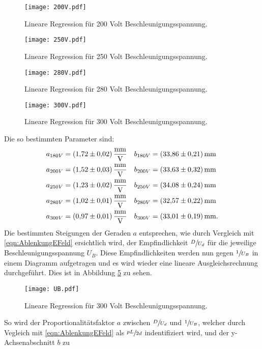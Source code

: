 \begin{figure}
  \centering
  \texttt{[image: 200V.pdf]}
  \caption{Lineare Regression für 200 Volt Beschleunigungsspannung.}
  \label{fig:200V}
\end{figure}
\begin{figure}
  \centering
  \texttt{[image: 250V.pdf]}
  \caption{Lineare Regression für 250 Volt Beschleunigungsspannung.}
  \label{fig:250V}
\end{figure}
\begin{figure}
  \centering
  \texttt{[image: 280V.pdf]}
  \caption{Lineare Regression für 280 Volt Beschleunigungsspannung.}
  \label{fig:280V}
\end{figure}
\begin{figure}
  \centering
  \texttt{[image: 300V.pdf]}
  \caption{Lineare Regression für 300 Volt Beschleunigungsspannung.}
  \label{fig:300V}
\end{figure}
\FloatBarrier
Die so bestimmten Parameter sind:
\begin{align*}
  a_{180V} &= \SI{1.72\pm0.02}{\milli\metre\per\volt} & b_{180V} &= \SI{33.86\pm0.21}{\milli\metre} \\
  a_{200V} &= \SI{1.52\pm0.03}{\milli\metre\per\volt} & b_{200V} &= \SI{33.63\pm0.32}{\milli\metre} \\
  a_{250V} &= \SI{1.23\pm0.02}{\milli\metre\per\volt} & b_{250V} &= \SI{34.08\pm0.24}{\milli\metre} \\
  a_{280V} &= \SI{1.02\pm0.01}{\milli\metre\per\volt} & b_{280V} &= \SI{32.57\pm0.22}{\milli\metre} \\
  a_{300V} &= \SI{0.97\pm0.01}{\milli\metre\per\volt} & b_{300V} &= \SI{33.01\pm0.19}{\milli\metre}.
\end{align*}
Die bestimmten Steigungen der Geraden $a$ entsprechen, wie durch Vergleich mit \eqref{eqn:AblenkungEFeld} ersichtlich wird, der Empfindlichkeit $\sfrac{D}{U_d}$ für
die jeweilige Beschleunigungsspannung $U_B$. Diese Empfindlichkeiten werden nun gegen $\sfrac{1}{U_B}$ in einem Diagramm aufgetragen und es wird wieder eine lineare
Ausgleichsrechnung durchgeführt. Dies ist in Abbildung \ref{fig:UB} zu sehen.
\begin{figure}
  \centering
  \texttt{[image: UB.pdf]}
  \caption{Lineare Regression für 300 Volt Beschleunigungsspannung.}
  \label{fig:UB}
\end{figure}
So wird der Proportionalitätsfaktor $a$ zwischen $\sfrac{D}{U_d}$ und $\sfrac{1}{U_B}$, welcher durch Vegleich mit \eqref{eqn:AblenkungEFeld} als
$\sfrac{pL}{2d}$ indentifiziert wird, und der y-Achsenabschnitt $b$ zu

